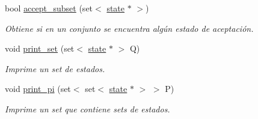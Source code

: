 \begin{DoxyCompactItemize}
\item 
bool \hyperlink{classdfa_a30c15f90f675b48d8259a50751a53cdf}{accept\+\_\+subset} (set$<$ \hyperlink{classstate}{state} $\ast$ $>$)
\begin{DoxyCompactList}\small\item\em Obtiene si en un conjunto se encuentra algún estado de aceptación. \end{DoxyCompactList}\item 
void \hyperlink{classdfa_a4d1547f6524fefbcda953e6113118c28}{print\+\_\+set} (set$<$ \hyperlink{classstate}{state} $\ast$ $>$ Q)
\begin{DoxyCompactList}\small\item\em Imprime un set de estados. \end{DoxyCompactList}\item 
void \hyperlink{classdfa_a1c6926b7cbff111a10a1276c7a1ac512}{print\+\_\+pi} (set$<$ set$<$ \hyperlink{classstate}{state} $\ast$ $>$ $>$ P)
\begin{DoxyCompactList}\small\item\em Imprime un set que contiene sets de estados. \end{DoxyCompactList}\end{DoxyCompactItemize}
